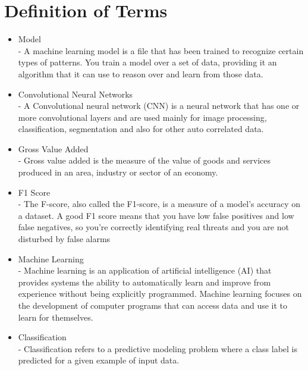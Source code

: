 \section{Definition of Terms}
    \begin{itemize}
        \item Model \\
              - A machine learning model is a file that has
              been trained to recognize certain types of patterns.
              You train a model over a set of data, providing it an
              algorithm that it can use to reason over and learn 
              from those data.

        \item Convolutional Neural Networks \\
              - A Convolutional neural network (CNN) is a neural network 
              that has one or more convolutional layers and are used mainly
              for image processing, classification, segmentation and also 
              for other auto correlated data.

        \item Gross Value Added \\
              - Gross value added is the measure of the value of 
              goods and services produced in an area, industry or sector 
              of an economy.

        \item F1 Score \\
              - The F-score, also called the F1-score, is a measure of a model's accuracy 
              on a dataset. A good F1 score means that you have low false positives and 
              low false negatives, so you're correctly identifying real threats and you are not disturbed by false alarms
              
        \item Machine Learning \\
              - Machine learning is an application of artificial intelligence 
              (AI) that provides systems the ability to automatically learn and
              improve from experience without being explicitly programmed. 
              Machine learning focuses on the development of computer programs 
              that can access data and use it to learn for themselves.

        \item Classification \\
              - Classification refers to a predictive modeling problem where a
              class label is predicted for a given example of input data.
              

\end{itemize}
